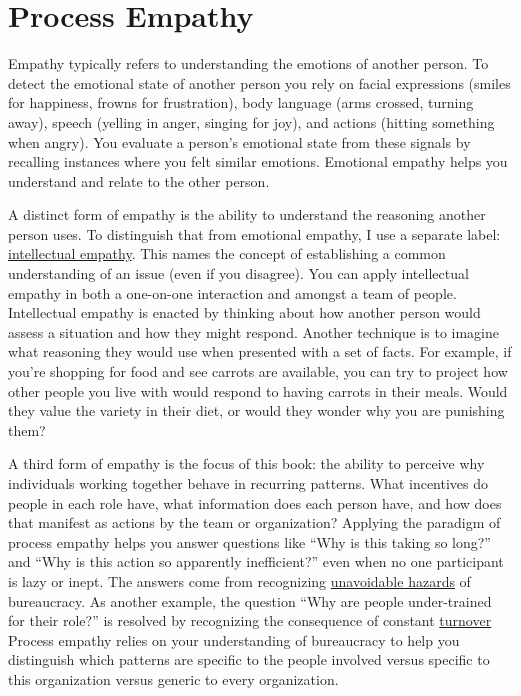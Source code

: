 \section{Process Empathy\label{sec:process-empathy}}

Empathy typically refers to understanding the emotions of another person. To detect the emotional state of another person you rely on facial expressions (smiles for happiness, frowns for frustration), body language (arms crossed, turning away), speech (yelling in anger, singing for joy), and actions (hitting something when angry). You evaluate a person's emotional state from these signals by recalling instances where you felt similar emotions. Emotional empathy helps you understand and relate to the other person. 

A distinct form of empathy is the ability to understand the reasoning another person uses. 
To distinguish that from emotional empathy, I use a separate label: 
\hyperref[sec:intellectual-empathy]{intellectual empathy}.
This names the concept of establishing a common understanding of an issue (even if you disagree). You can apply intellectual empathy in both a one-on-one interaction and amongst a team of people. Intellectual empathy is enacted by thinking about how another person would assess a situation and how they might respond. Another technique is to imagine what reasoning they would use when presented with a set of facts. For example, if you're shopping for food and see carrots are available, you can try to project how other people you live with would respond to having carrots in their meals. Would they value the variety in their diet, or would they wonder why you are punishing them?


A third form of empathy is the focus of this book: the ability to perceive why individuals working together behave in recurring patterns. What incentives do people in each role have, what information does each person have, and how does that manifest as actions by the team or organization? Applying the paradigm of \gls{process empathy} 
\iftoggle{glossaryinmargin}{\marginpar{[Glossary]}}{} helps you answer questions like ``Why is this taking so long?'' and ``Why is this action so apparently inefficient?'' even when no one participant is lazy or inept. The answers come from recognizing 
\hyperref[sec:unavoidable-hazards]{unavoidable hazards}\iftoggle{haspagenumbers}{ (see page~\pageref{sec:unavoidable-hazards})}{}
of bureaucracy. As another example, the question ``Why are people under-trained for their role?'' is resolved by recognizing the consequence of  constant 
\hyperref[sec:turnover]{turnover}\iftoggle{haspagenumbers}{ (see page~\pageref{sec:turnover}).}{.}
Process empathy relies on your understanding of bureaucracy to help you distinguish which patterns are specific to the people involved versus specific to this organization versus generic to every organization.

